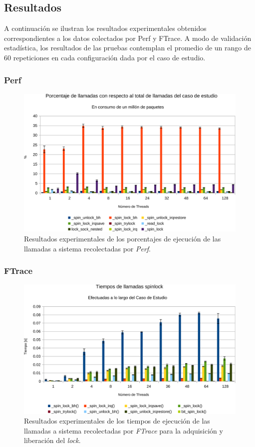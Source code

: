 \subsection{Resultados}
A continuación se ilustran los resultados experimentales obtenidos correspondientes a los datos colectados por Perf y FTrace. A modo de validación estadística, los resultados de las pruebas contemplan el promedio de un rango de 60 repeticiones en cada configuración dada por el caso de estudio.

\subsubsection{Perf}
\begin{figure}[!h]
	\centering
	\includegraphics[scale=.6]{resultados/perfdetalle-crop.pdf}
	\caption{Resultados experimentales de los porcentajes de ejecución de las llamadas a sistema recolectadas por \emph{Perf}.}
	\label{fig:resPerf}
\end{figure}

\subsubsection{FTrace}
\begin{figure}[!h]
	\centering
	\includegraphics[scale=.6]{resultados/detalleFtrace-crop.pdf}
	\caption{Resultados experimentales de los tiempos de ejecución de las llamadas a sistema recolectadas por \emph{FTrace} para la adquisición y liberación del \emph{lock}.}
	\label{fig:detalleftrace}
\end{figure}


